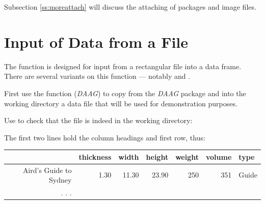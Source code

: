 Subsection \ref{ss:moreattach} will discuss the attaching of packages
and image files.

\section{Input of Data from a File}\label{sec:input}

The function  is designed for input from a
rectangular file into a data frame. There are several variants on this
function --- notably  and .

  First use the function 
(\textit{DAAG}) to copy from the {\em DAAG} package and into the
working directory a data file that will be used for demonstration purposes.

\begin{knitrout}
\color{fgcolor}\begin{kframe}
\begin{alltt}
\hlopt{::}\hlstd{(}\hlstd{)}
\end{alltt}
\end{kframe}
\end{knitrout}
\noindent
Use  to check that the file is indeed in the working directory:
\begin{knitrout}
\color{fgcolor}\begin{kframe}
\begin{alltt}
\hlstd{(}\hlstd{=}\hlstd{)}
\end{alltt}
\end{kframe}
\end{knitrout}

The first two lines hold the column headings and first row, thus:\vspace*{9pt}

\noindent
{
\begin{tabular}{rrrrrrl}
\hline
 & thickness & width & height & weight & volume & type \\
\hline
Aird's Guide to Sydney & 1.30 & 11.30 & 23.90       & 250 &  351 &    Guide \\
. . .
\end{tabular}
}
\vspace*{3pt}


